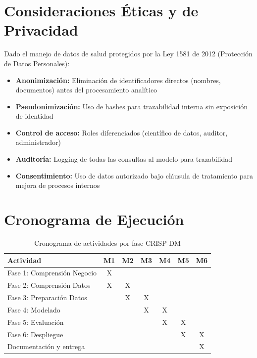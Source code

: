 \documentclass[12pt,letterpaper]{report}
\begin{document}
\section{Consideraciones Éticas y de Privacidad}

Dado el manejo de datos de salud protegidos por la Ley 1581 de 2012 (Protección de Datos Personales):

\begin{itemize}
    \item \textbf{Anonimización:} Eliminación de identificadores directos (nombres, documentos) antes del procesamiento analítico
    \item \textbf{Pseudonimización:} Uso de hashes para trazabilidad interna sin exposición de identidad
    \item \textbf{Control de acceso:} Roles diferenciados (científico de datos, auditor, administrador)
    \item \textbf{Auditoría:} Logging de todas las consultas al modelo para trazabilidad
    \item \textbf{Consentimiento:} Uso de datos autorizado bajo cláusula de tratamiento para mejora de procesos internos
\end{itemize}

\section{Cronograma de Ejecución}

\begin{table}[H]
\centering
\caption{Cronograma de actividades por fase CRISP-DM}
\small
\begin{tabular}{@{}p{4.5cm}cccccc@{}}
\toprule
\textbf{Actividad} & \textbf{M1} & \textbf{M2} & \textbf{M3} & \textbf{M4} & \textbf{M5} & \textbf{M6} \\
\midrule
Fase 1: Comprensión Negocio & \cellcolor{minsalud!30}X & & & & & \\
Fase 2: Comprensión Datos & \cellcolor{minsalud!30}X & \cellcolor{minsalud!30}X & & & & \\
Fase 3: Preparación Datos & & \cellcolor{minsalud!30}X & \cellcolor{minsalud!30}X & & & \\
Fase 4: Modelado & & & \cellcolor{minsalud!30}X & \cellcolor{minsalud!30}X & & \\
Fase 5: Evaluación & & & & \cellcolor{minsalud!30}X & \cellcolor{minsalud!30}X & \\
Fase 6: Despliegue & & & & & \cellcolor{minsalud!30}X & \cellcolor{minsalud!30}X \\
Documentación y entrega & & & & & & \cellcolor{minsalud!30}X \\
\bottomrule
\end{tabular}
\end{table}
\end{document}
